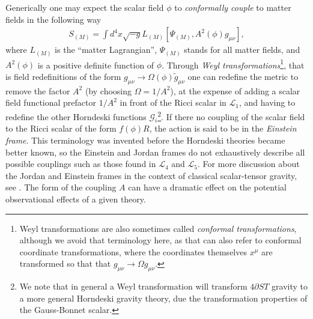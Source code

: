 \documentclass{ws-ijmpd}
\begin{document}
Generically one may expect the scalar field $\phi$ to 
\emph{conformally couple} to 
matter fields in the following way\cite{fujii_maeda_2003,will_2018} 
\begin{align}
   S_{(M)}
   =
   \int d^4x\sqrt{-g}L_{(M)}\left[
      \Psi_{(M)},A^2\left(\phi\right)g_{\mu\nu}
   \right]
   ,
\end{align}
where $L_{(M)}$ is the ``matter Lagrangian'', $\Psi_{(M)}$ stands for
all matter fields, and $A^2\left(\phi\right)$
is a positive definite function of $\phi$.
Through \emph{Weyl transformations}\footnote{Weyl transformations
are also sometimes called \emph{conformal transformations},
although we avoid that terminology here, as that 
can also refer to conformal coordinate transformations, where the
coordinates themselves $x^{\mu}$ are transformed so that that
$g_{\mu\nu}\to\Omega g_{\mu\nu}$.}, that is field redefinitions
of the form $g_{\mu\nu}\to\Omega\left(\phi\right)\tilde{g}_{\mu\nu}$
one can redefine the metric to remove the factor $A^2$
(by choosing $\Omega=1/A^2$),
at the expense of adding a scalar field functional prefactor
$1/A^2$ in front of the Ricci scalar in $\mathcal{L}_1$,
and having to redefine the other Horndeski functions 
$\mathcal{G}_i$\footnote{We
note that in general a Weyl transformation will transform $4\partial ST$
gravity to a more general Horndeski gravity theory, 
due the transformation properties of the 
Gauss-Bonnet scalar\cite{Maeda:2009uy}.}.
If there no coupling of the scalar field to
the Ricci scalar of the form $f\left(\phi\right)R$, the action
is said to be in the \emph{Einstein frame}.
This terminology
was invented before the Horndeski theories became better known,
so the Einstein and Jordan frames do not exhaustively describe all
possible couplings such as those found in $\mathcal{L}_4$ and $\mathcal{L}_5$.
For more discussion about the Jordan and Einstein frames
in the context of classical scalar-tensor gravity, see .
The form of the coupling $A$
can have a dramatic effect on the potential observational effects
of a given theory\cite{Damour:1996ke,fujii_maeda_2003,Will:2014kxa,will_2018}. 
\end{document}

